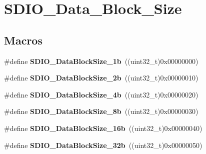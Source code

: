 \hypertarget{group___s_d_i_o___data___block___size}{\section{S\-D\-I\-O\-\_\-\-Data\-\_\-\-Block\-\_\-\-Size}
\label{group___s_d_i_o___data___block___size}
}
\subsection*{Macros}
\begin{DoxyCompactItemize}
\item 
\hypertarget{group___s_d_i_o___data___block___size_gaa86e90ddc3426b242a5230b3360c620d}{\#define {\bfseries S\-D\-I\-O\-\_\-\-Data\-Block\-Size\-\_\-1b}~((uint32\-\_\-t)0x00000000)}\label{group___s_d_i_o___data___block___size_gaa86e90ddc3426b242a5230b3360c620d}

\item 
\hypertarget{group___s_d_i_o___data___block___size_ga7209d9d52635b66df85712c6fcd668ea}{\#define {\bfseries S\-D\-I\-O\-\_\-\-Data\-Block\-Size\-\_\-2b}~((uint32\-\_\-t)0x00000010)}\label{group___s_d_i_o___data___block___size_ga7209d9d52635b66df85712c6fcd668ea}

\item 
\hypertarget{group___s_d_i_o___data___block___size_ga59cbaecfdebd63177d1208c268626f0a}{\#define {\bfseries S\-D\-I\-O\-\_\-\-Data\-Block\-Size\-\_\-4b}~((uint32\-\_\-t)0x00000020)}\label{group___s_d_i_o___data___block___size_ga59cbaecfdebd63177d1208c268626f0a}

\item 
\hypertarget{group___s_d_i_o___data___block___size_ga14f91159c8c4faf49a335ed9b6a94d0b}{\#define {\bfseries S\-D\-I\-O\-\_\-\-Data\-Block\-Size\-\_\-8b}~((uint32\-\_\-t)0x00000030)}\label{group___s_d_i_o___data___block___size_ga14f91159c8c4faf49a335ed9b6a94d0b}

\item 
\hypertarget{group___s_d_i_o___data___block___size_ga52a7bdab9a75edd94d9c1152e8b078e2}{\#define {\bfseries S\-D\-I\-O\-\_\-\-Data\-Block\-Size\-\_\-16b}~((uint32\-\_\-t)0x00000040)}\label{group___s_d_i_o___data___block___size_ga52a7bdab9a75edd94d9c1152e8b078e2}

\item 
\hypertarget{group___s_d_i_o___data___block___size_gad0f89aa989c0cedf8d69eb28548413ca}{\#define {\bfseries S\-D\-I\-O\-\_\-\-Data\-Block\-Size\-\_\-32b}~((uint32\-\_\-t)0x00000050)}\label{group___s_d_i_o___data___block___size_gad0f89aa989c0cedf8d69eb28548413ca}


\end{DoxyCompactItemize}
